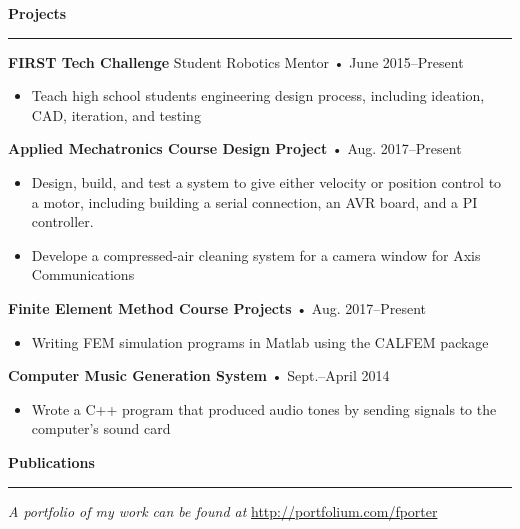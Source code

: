 \documentclass[12pt, oneside]{article}
\newcommand{\headingstyleJobs}[1] {
	{\fontsize{20pt}{1em}\selectfont \bf \textcolor{new_red}{#1}}
	\textcolor{new_red}{\rule{3.25in}{0.5pt}} \vspace{3pt}
}
\newcommand{\jobtitle}[3] {
	{\bf #1} {#2} • {#3} \vspace{-10pt} \\
}
\begin{document}
\begin{flushleft}
\headingstyleJobs{Projects}

\jobtitle{FIRST Tech Challenge}{Student Robotics Mentor}{June 2015–Present}
\begin{itemize}
	\item Teach high school students engineering design process, including ideation, CAD, iteration, and testing
\end{itemize}

\jobtitle{Applied Mechatronics Course Design Project}{}{Aug. 2017–Present}
\begin{itemize}
	\item Design, build, and test a system to give either velocity or position control to a motor, including building a serial connection, an AVR board, and a PI controller.
	\item Develope a compressed-air cleaning system for a camera window for Axis Communications
\end{itemize}

\jobtitle{Finite Element Method Course Projects}{}{Aug. 2017–Present}
\begin{itemize}
	\item Writing FEM simulation programs in Matlab using the CALFEM package
\end{itemize}

\jobtitle{Computer Music Generation System}{}{Sept.–April 2014}
\begin{itemize}
	\item Wrote a C++ program that produced audio tones by sending signals to the computer's sound card
\end{itemize}


\headingstyleJobs{Publications}

\vspace{-9pt}
\nocite{OWMS-DSA}




\textit{A portfolio of my work can be found at} \url{http://portfolium.com/fporter}

\end{flushleft}
\end{document}
